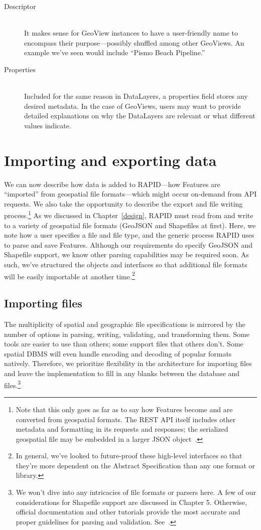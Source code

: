 \begin{description}
\item[Descriptor] \hfill \\
It makes sense for GeoView instances to have a user-friendly name to encompass their purpose---possibly shuffled among other GeoViews. An example we've seen would include ``Pismo Beach Pipeline.''

\item[Properties] \hfill \\
Included for the same reason in DataLayers, a properties field stores any desired metadata. In the case of GeoViews, users may want to provide detailed explanations on why the DataLayers are relevant or what different values indicate.

\end{description}


\section{Importing and exporting data}
We can now describe how data is added to RAPID---how Features are ``imported'' from geospatial file formats---which might occur on-demand from API requests. We also take the opportunity to describe the export and file writing process.\footnote{Note that this only goes as far as to say how Features become and are converted from geospatial formats. The REST API itself includes other metadata and formatting in its requests and responses; the serialized geospatial file may be embedded in a larger JSON object~\cite{Francis}.} As we discussed in Chapter~\ref{design}, RAPID must read from and write to a variety of geospatial file formats (GeoJSON and Shapefiles at first). Here, we note how a user specifies a file and file type, and the generic process RAPID uses to parse and save Features. Although our requirements do specify GeoJSON and Shapefile support, we know other parsing capabilities may be required soon. As such, we've structured the objects and interfaces so that additional file formats will be easily importable at another time.\footnote{In general, we've looked to future-proof these high-level interfaces so that they're more dependent on the Abstract Specification than any one format or library.}

\subsection{Importing files}
The multiplicity of spatial and geographic file specifications is mirrored by the number of options in parsing, writing, validating, and transforming them. Some tools are easier to use than others; some support files that others don't. Some spatial DBMS will even handle encoding and decoding of popular formats natively. Therefore, we prioritize flexibility in the architecture for importing files and leave the implementation to fill in any blanks between the database and files.\footnote{We won't dive into any intricacies of file formats or parsers here. A few of our considerations for Shapefile support are discussed in Chapter 5. Otherwise, official documentation and other tutorials provide the most accurate and proper guidelines for parsing and validation. See~\cite{}.}

